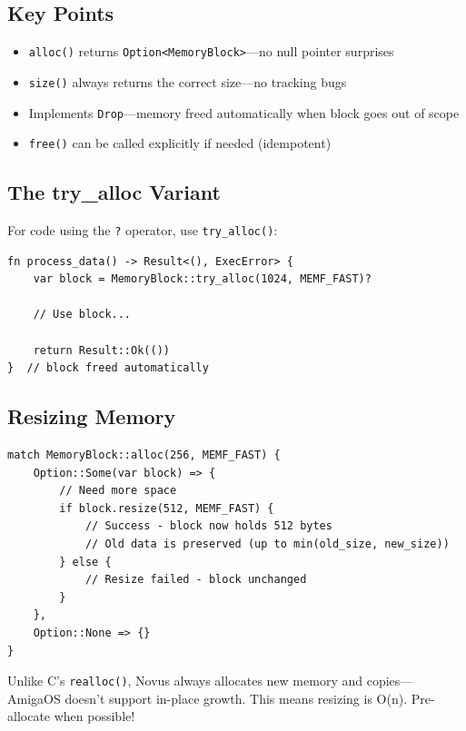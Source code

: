 \subsection{Key Points}

\begin{itemize}
    \item \texttt{alloc()} returns \texttt{Option<MemoryBlock>}---no null pointer surprises
    \item \texttt{size()} always returns the correct size---no tracking bugs
    \item Implements \texttt{Drop}---memory freed automatically when block goes out of scope
    \item \texttt{free()} can be called explicitly if needed (idempotent)
\end{itemize}

\subsection{The try\_alloc Variant}

For code using the \texttt{?} operator, use \texttt{try\_alloc()}:

\begin{lstlisting}
fn process_data() -> Result<(), ExecError> {
    var block = MemoryBlock::try_alloc(1024, MEMF_FAST)?

    // Use block...

    return Result::Ok(())
}  // block freed automatically
\end{lstlisting}

\subsection{Resizing Memory}

\begin{lstlisting}
match MemoryBlock::alloc(256, MEMF_FAST) {
    Option::Some(var block) => {
        // Need more space
        if block.resize(512, MEMF_FAST) {
            // Success - block now holds 512 bytes
            // Old data is preserved (up to min(old_size, new_size))
        } else {
            // Resize failed - block unchanged
        }
    },
    Option::None => {}
}
\end{lstlisting}

\begin{warningbox}
Unlike C's \texttt{realloc()}, Novus always allocates new memory and copies---AmigaOS doesn't support in-place growth. This means resizing is O(n). Pre-allocate when possible!
\end{warningbox}

